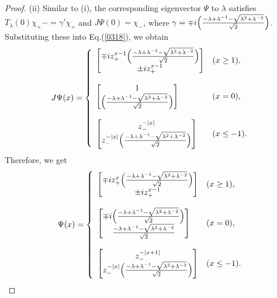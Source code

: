 \documentclass[a4paper,12pt]{article}
\theoremstyle{plain}
\theoremstyle{definition}
\theoremstyle{definition}
\begin{document}
\begin{proof}
($\mathrm{ii}$) Similar to (i),  the corresponding eigenvector $\Psi$ to $\lambda$ satisfies $T_{\lambda}(0)\chi_+- = \gamma' \chi_+$ and $J\Psi(0) = \chi_-$, where $\gamma =\mp i \Bigl( \frac{-\lambda +\lambda^{-1}-\sqrt{\lambda^2+\lambda^{-2}}}{\sqrt{2}} \Bigr)$. Substituting these into Eq.(\ref{0318}), we obtain
\begin{eqnarray}
J\Psi(x)=
\left\{\begin{array}{ll}
\begin{bmatrix}
\mp i z_{+}^{x-1}\Bigl(\frac{-\lambda +\lambda^{-1}-\sqrt{\lambda^2+\lambda^{-2}}}{\sqrt{2}} \Bigr) \\
\pm iz_{+}^{x-1}
\end{bmatrix} & (x\geq 1 ), \\\\
\begin{bmatrix}
    1 \\
    \Bigl(\frac{-\lambda +\lambda^{-1}-\sqrt{\lambda^2+\lambda^{-2}}}{\sqrt{2}} \Bigr)
\end{bmatrix} & (x=0), \\\\
\begin{bmatrix}
z_{-}^{-|x|} \\
z_{-}^{-|x|}\Bigl(\frac{-\lambda +\lambda^{-1}-\sqrt{\lambda^2+\lambda^{-2}}}{\sqrt{2}} \Bigr)
\end{bmatrix} & (x\leq -1).
\end{array}\right. \nonumber
\end{eqnarray}
Therefore, we get
\begin{eqnarray}
\Psi(x)=
\left\{\begin{array}{ll}
\begin{bmatrix}
\mp i z_{+}^{x} \Bigl(\frac{-\lambda +\lambda^{-1}-\sqrt{\lambda^2+\lambda^{-2}}}{\sqrt{2}} \Bigr) \\
\pm i z_{+}^{x-1}
\end{bmatrix} & (x\geq 1 ), \\\\
\begin{bmatrix}
    \mp i \Bigl(\frac{-\lambda +\lambda^{-1}-\sqrt{\lambda^2+\lambda^{-2}}}{\sqrt{2}} \Bigr) \\
    \frac{-\lambda +\lambda^{-1}-\sqrt{\lambda^2+\lambda^{-2}}}{\sqrt{2}}
\end{bmatrix} & (x=0), \\\\
\begin{bmatrix}
z_{-}^{-|x+1|} \\
z_{-}^{-|x|}\Bigl(\frac{-\lambda +\lambda^{-1}-\sqrt{\lambda^2+\lambda^{-2}}}{\sqrt{2}} \Bigr)
\end{bmatrix} & (x\leq -1).
\end{array}\right. \nonumber
\end{eqnarray}
\end{proof}
\end{document}
